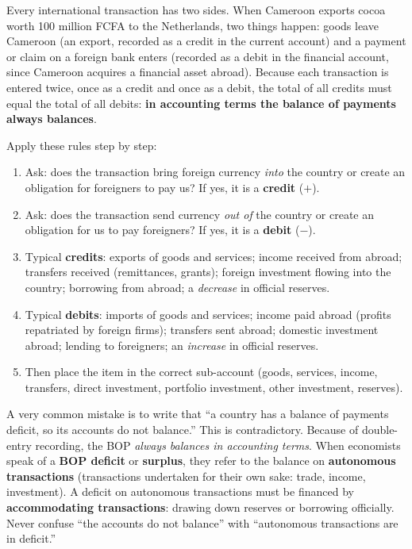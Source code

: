 \documentclass[11pt]{article}
\newcommand{\cle}[1]{{\popxbold\color{popdark}#1}}
\newcounter{popsec}
\newcounter{popsub}
\newcommand{\courssub}[1]{%
  \stepcounter{popsub}%
  \par\vspace{9pt}\noindent{\popxbold\fontsize{11.5}{13}\selectfont\color{popink}{\color{poporange}\thepopsec.\thepopsub}\hspace{6pt}#1}\par\nopagebreak\vspace{4pt}
}
\begin{document}
\courssub{Double-Entry Recording: Credits and Debits}

Every international transaction has two sides. When Cameroon exports cocoa worth 100 million FCFA to the Netherlands, two things happen: goods leave Cameroon (an export, recorded as a \cle{credit} in the current account) and a payment or claim on a foreign bank enters (recorded as a \cle{debit} in the financial account, since Cameroon acquires a financial asset abroad). Because each transaction is entered twice, once as a credit and once as a debit, the total of all credits must equal the total of all debits: \textbf{in accounting terms the balance of payments always balances}.

\begin{methode}
Apply these rules step by step:
\begin{enumerate}
\item Ask: does the transaction bring foreign currency \emph{into} the country or create an obligation for foreigners to pay us? If yes, it is a \textbf{credit} ($+$).
\item Ask: does the transaction send currency \emph{out of} the country or create an obligation for us to pay foreigners? If yes, it is a \textbf{debit} ($-$).
\item Typical \textbf{credits}: exports of goods and services; income received from abroad; transfers received (remittances, grants); foreign investment flowing into the country; borrowing from abroad; a \emph{decrease} in official reserves.
\item Typical \textbf{debits}: imports of goods and services; income paid abroad (profits repatriated by foreign firms); transfers sent abroad; domestic investment abroad; lending to foreigners; an \emph{increase} in official reserves.
\item Then place the item in the correct sub-account (goods, services, income, transfers, direct investment, portfolio investment, other investment, reserves).
\end{enumerate}
\end{methode}

\begin{attention}
A very common mistake is to write that ``a country has a balance of payments deficit, so its accounts do not balance.'' This is contradictory. Because of double-entry recording, the BOP \emph{always balances in accounting terms}. When economists speak of a \textbf{BOP deficit} or \textbf{surplus}, they refer to the balance on \textbf{autonomous transactions} (transactions undertaken for their own sake: trade, income, investment). A deficit on autonomous transactions must be financed by \textbf{accommodating transactions}: drawing down reserves or borrowing officially. Never confuse ``the accounts do not balance'' with ``autonomous transactions are in deficit.''
\end{attention}
\end{document}
